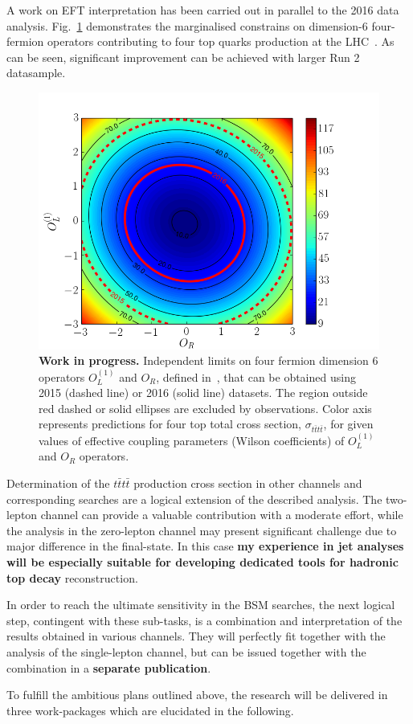 A work on EFT interpretation has been carried out in parallel to the 2016 data analysis. Fig.~\ref{fig:C1_C2} demonstrates the marginalised constrains on dimension-6 four-fermion operators contributing to four top quarks production at the LHC~\cite{DegrandeEFTthesis,Zhang:2017mls}. As can be seen, significant improvement can be achieved with larger Run 2 datasample.
\begin{figure}[h]
\centering
\includegraphics[width=0.7\linewidth]{figures/C1_C2}
\caption{\textbf{Work in progress.} Independent limits on four fermion dimension 6 operators $O_{L}^{\left(1 \right) }$ and $O_R$, defined in~\cite{DegrandeEFTthesis}, that can be obtained using 2015 (dashed line) or 2016 (solid line) datasets. The region outside red dashed or solid ellipses are excluded by observations. Color axis represents predictions for four top total cross section, $\sigma_{t\bar{t}t\bar{t}}$, for given values of effective coupling parameters (Wilson coefficients) of $O_{L}^{\left(1 \right) }$ and $O_R$ operators.}
\label{fig:C1_C2}
\end{figure} 

Determination of the $t\bar{t}t\bar{t}$ production cross section in other channels and corresponding searches are a logical extension of the described analysis. The two-lepton channel can provide a valuable contribution with a moderate effort, while the analysis in the zero-lepton channel may present significant challenge due to major difference in the final-state. In this case \textbf{my experience in jet analyses will be especially suitable for developing dedicated tools for hadronic top decay} reconstruction.

In order to reach the ultimate sensitivity in the BSM searches, the next logical step, contingent with these sub-tasks, is a combination and interpretation of the results obtained in various channels. They will perfectly fit together with the analysis of the single-lepton channel, but can be issued together with the combination in a \textbf{separate publication}.

To fulfill the ambitious plans outlined above, the research will be delivered in three work-packages which are elucidated in the following.
